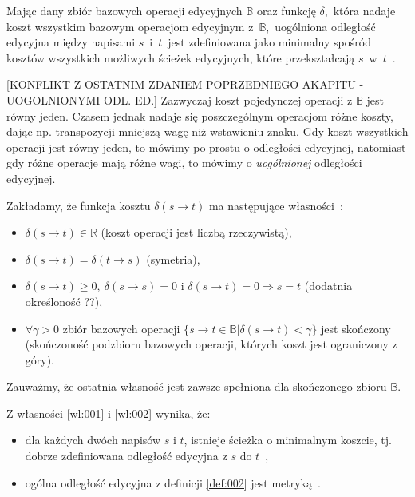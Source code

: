 \documentclass{praca1}
\begin{document}
\begin{definition}\label{def:002}
Mając dany zbiór bazowych operacji edycyjnych $\mathbb{B}$ oraz funkcję $\delta$,~która nadaje koszt wszystkim bazowym operacjom edycyjnym z~$\mathbb{B}$,~uogólniona odległość edycyjna między napisami $s$~i~$t$~jest zdefiniowana jako minimalny spośród kosztów wszystkich możliwych ścieżek edycyjnych, które przekształcają $s$~w~$t$~\cite{Boytsov2011:indexingmethods}.
\end{definition}

[KONFLIKT Z OSTATNIM ZDANIEM POPRZEDNIEGO AKAPITU - UOGOLNIONYMI ODL. ED.] Zazwyczaj koszt pojedynczej operacji z $\mathbb{B}$ jest równy jeden. Czasem jednak nadaje się poszczególnym operacjom różne koszty, dając np. transpozycji mniejszą wagę niż wstawieniu znaku. Gdy koszt wszystkich operacji jest równy jeden, to mówimy po prostu o odległości edycyjnej, natomiast gdy różne operacje mają różne wagi, to mówimy o \emph{uogólnionej} odległości edycyjnej.

\begin{property}\label{wl:002}
Zakładamy, że funkcja kosztu $\delta(s \rightarrow t)$ ma następujące własności~\cite{Boytsov2011:indexingmethods}:
\begin{itemize}
\item $\delta(s \rightarrow t) \in \mathbb{R}$ (koszt operacji jest liczbą rzeczywistą),
\item $\delta(s \rightarrow t) = \delta(t \rightarrow s)$ (symetria),
\item $\delta(s \rightarrow t) \geq 0,\ \delta(s \rightarrow s) = 0\text{ i } \delta(s \rightarrow t) = 0 \Rightarrow s = t$ (dodatnia określoność ??),
\item $\forall \gamma > 0$ zbiór bazowych operacji $\{s \rightarrow t \in \mathbb{B} | \delta(s \rightarrow t) < \gamma \}$ jest skończony (skończoność podzbioru bazowych operacji, których koszt jest ograniczony z góry).
\end{itemize}
\end{property}

Zauważmy, że ostatnia własność jest zawsze spełniona dla skończonego zbioru $\mathbb{B}$.

\begin{theorem}
Z własności \ref{wl:001} i \ref{wl:002} wynika, że:
\begin{itemize}
\item dla każdych dwóch napisów $s$ i $t$, istnieje ścieżka o minimalnym koszcie, tj. dobrze zdefiniowana odległość edycyjna z $s$ do $t$~\cite{Boytsov2011:indexingmethods},
\item ogólna odległość edycyjna z definicji \ref{def:002} jest metryką~\cite{Wagner1974:stringtostring}.
\end{itemize}
\end{theorem}
\end{document}
